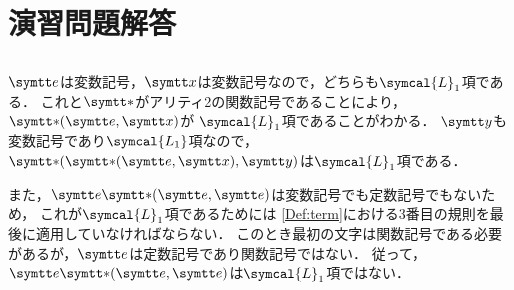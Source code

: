 \chapter{演習問題解答} \label{chap:answer}

\section*{}

\subsection*{} \label{answer:termexample}

\(\obj{e}\)は変数記号，\(\obj{x}\)は変数記号なので，どちらも\(\symcal{L}_1\)項である．
これと\(\obj{\ast}\)がアリティ2の関数記号であることにより，\(\apply{\obj{\ast}}{\obj{e}, \obj{x}}\)が
\(\symcal{L}_1\)項であることがわかる．
\(\obj{y}\)も変数記号であり\(\symcal{L_1}\)項なので，
\(\apply{\obj{\ast}}{\apply{\obj{\ast}}{\obj{e}, \obj{x}}, \obj{y}}\)は\(\symcal{L}_1\)項である．

また，\(\obj{e}\apply{\mathord{\obj{\ast}}}{\obj{e}, \obj{e}}\)は変数記号でも定数記号でもないため，
これが\(\symcal{L}_1\)項であるためには
\cref{Def:term}における3番目の規則を最後に適用していなければならない．
このとき最初の文字は関数記号である必要があるが，\(\obj{e}\)は定数記号であり関数記号ではない．
従って，\(\obj{e}\apply{\mathord{\obj{\ast}}}{\obj{e}, \obj{e}}\)は\(\symcal{L}_1\)項ではない．